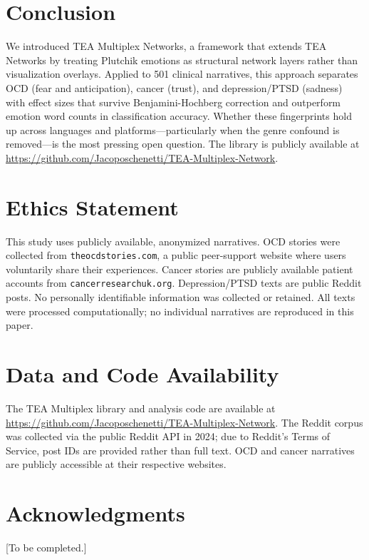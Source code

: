 \documentclass[11pt,a4paper]{article}
\begin{document}
\section{Conclusion}

We introduced TEA Multiplex Networks, a framework that extends TEA Networks by treating Plutchik emotions as structural network layers rather than visualization overlays.  Applied to 501 clinical narratives, this approach separates OCD (fear and anticipation), cancer (trust), and depression/PTSD (sadness) with effect sizes that survive Benjamini-Hochberg correction and outperform emotion word counts in classification accuracy.  Whether these fingerprints hold up across languages and platforms---particularly when the genre confound is removed---is the most pressing open question.  The library is publicly available at \url{https://github.com/Jacoposchenetti/TEA-Multiplex-Network}.


\section*{Ethics Statement}

This study uses publicly available, anonymized narratives.  OCD stories were collected from \texttt{theocdstories.com}, a public peer-support website where users voluntarily share their experiences.  Cancer stories are publicly available patient accounts from \texttt{cancerresearchuk.org}.  Depression/PTSD texts are public Reddit posts.  No personally identifiable information was collected or retained.  All texts were processed computationally; no individual narratives are reproduced in this paper.

\section*{Data and Code Availability}

The TEA Multiplex library and analysis code are available at \url{https://github.com/Jacoposchenetti/TEA-Multiplex-Network}.  The Reddit corpus was collected via the public Reddit API in 2024; due to Reddit's Terms of Service, post IDs are provided rather than full text.  OCD and cancer narratives are publicly accessible at their respective websites.

\section*{Acknowledgments}

[To be completed.]
\end{document}
